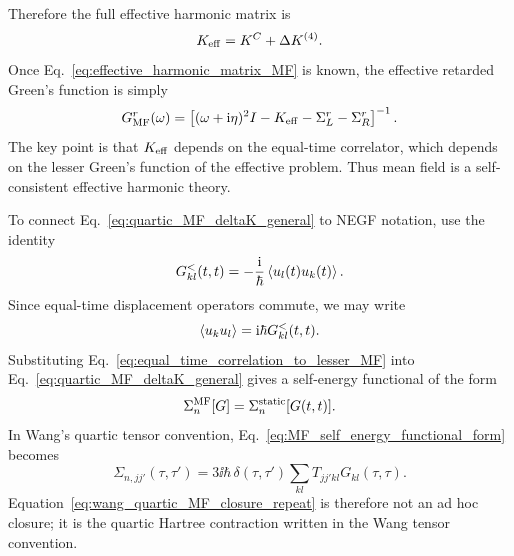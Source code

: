 Therefore the full effective harmonic matrix is
\begin{equation}
    K_{\rm eff} = K^C + \Delta K^{(4)}.
    \label{eq:effective_harmonic_matrix_MF}
\end{equation}
Once Eq.~\eqref{eq:effective_harmonic_matrix_MF} is known, the effective retarded Green's function is simply
\begin{equation}
    G^r_{\rm MF}(\omega)
    =
    \left[ (\omega+\mathrm{i}\eta)^2I - K_{\rm eff} - \Sigma_L^r - \Sigma_R^r \right]^{-1}.
    \label{eq:MF_retarded_green_from_keff}
\end{equation}
The key point is that $K_{\rm eff}$ depends on the equal-time correlator, which depends on the lesser Green's function of the effective problem. Thus mean field is a self-consistent effective harmonic theory.

To connect Eq.~\eqref{eq:quartic_MF_deltaK_general} to NEGF notation, use the identity
\begin{equation}
    G^<_{kl}(t,t) = -\frac{\mathrm{i}}{\hbar}\left\langle u_l(t)u_k(t) \right\rangle.
\end{equation}
Since equal-time displacement operators commute, we may write
\begin{equation}
    \left\langle u_k u_l \right\rangle = \mathrm{i}\hbar G^<_{kl}(t,t).
    \label{eq:equal_time_correlation_to_lesser_MF}
\end{equation}
Substituting Eq.~\eqref{eq:equal_time_correlation_to_lesser_MF} into Eq.~\eqref{eq:quartic_MF_deltaK_general} gives a self-energy functional of the form
\begin{equation}
    \Sigma_n^{\rm MF}[G]
    =
    \Sigma_n^{\rm static}[G(t,t)].
    \label{eq:MF_self_energy_functional_form}
\end{equation}
In Wang's quartic tensor convention, Eq.~\eqref{eq:MF_self_energy_functional_form} becomes
\begin{equation}
    \Sigma_{n,jj'}(\tau,\tau') = 3\ii\hbar\,\delta(\tau,\tau')\sum_{kl}T_{jj'kl}G_{kl}(\tau,\tau).
    \label{eq:wang_quartic_MF_closure_repeat}
\end{equation}
Equation~\eqref{eq:wang_quartic_MF_closure_repeat} is therefore not an ad hoc closure; it is the quartic Hartree contraction written in the Wang tensor convention.


